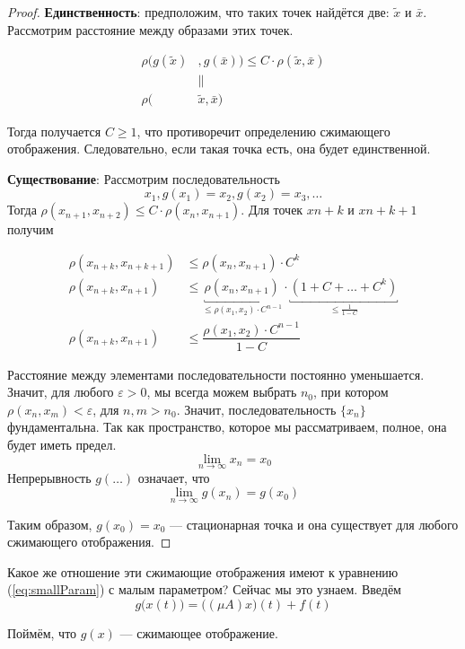 \documentclass[12pt]{article}
\begin{document}
	\begin{proof}
		\textbf{Единственность}: предположим, что таких точек найдётся две: $\tilde{x}$ и $\bar{x}$. Рассмотрим 
		расстояние между образами этих точек.
		
		\begin{align*}
			\rho(g(\tilde{x})&, g(\bar{x})) \leq C \cdot \rho(\tilde{x}, \bar{x}) \\
			&\parallel \\
			\rho(&\tilde{x}, \bar{x})
		\end{align*}
		
		Тогда получается $C \geq 1$, что противоречит определению сжимающего отображения. Следовательно, если такая точка есть, она
		будет единственной.
		
		\textbf{Существование}: Рассмотрим последовательность 
		$$x_1, g(x_1) = x_2, g(x_2) = x_3, \ldots$$
		Тогда $\rho(x_{n+1},x_{n+2}) \leq C \cdot \rho(x_n, x_{n+1})$. Для точек $x{n+k}$ и $x{n+k+1}$ получим
		
		\begin{align*}
			\rho(x_{n+k},x_{n+k+1}) &\leq \rho(x_n, x_{n+1}) \cdot C^k \\
			\rho(x_{n+k},x_{n+1}) &\leq \underbracket{\rho(x_n, x_{n+1})}_{\leq \rho(x_1, x_2)\cdot C^{n-1}} 
			\cdot \underbracket{(1 + C + \ldots + C^k)}_{\leq \frac{1	}{1-C}} \\
			\rho(x_{n+k},x_{n+1}) &\leq \dfrac{\rho(x_1, x_2)\cdot C^{n-1}}{1-C}
		\end{align*}
		
		Расстояние между элементами последовательности постоянно уменьшается. Значит, для любого $\varepsilon > 0$, мы 
		всегда можем выбрать $n_0$, при котором $\rho(x_n, x_m) < \varepsilon$, для $n,m > n_0$. Значит, последовательность
		$\{x_n\}$ фундаментальна. Так как пространство, которое мы рассматриваем, полное, она будет иметь предел.		
		$$\underset{n \rightarrow \infty}{\lim} x_n = x_0$$		
		Непрерывность $g(\ldots)$ означает, что 
		$$\underset{n \rightarrow \infty}{\lim} g(x_n) = g(x_0)$$
		
		Таким образом, $g(x_0) = x_0$ --- стационарная точка и она существует для любого сжимающего отображения.
	\end{proof}
	
	Какое же отношение эти сжимающие отображения имеют к уравнению (\ref{eq:smallParam}) с малым параметром? 
	Сейчас мы это узнаем. Введём 
	$$g\big(x(t)\big) = \big((\mu A)x\big)(t) + f(t)$$
	
	Поймём, что $g(x)$ --- сжимающее отображение.
	
\end{document}
